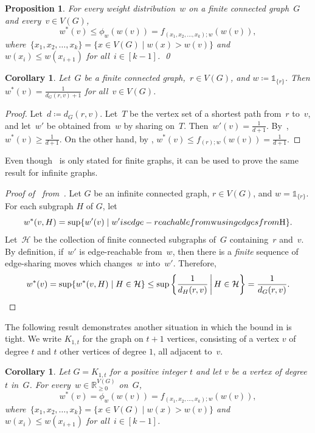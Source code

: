 \documentclass[reqno, 12pt]{amsart}
\numberwithin{equation}{section}
\numberwithin{figure}{section}
\theoremstyle{plain}
\newtheorem{cor}[thm]{Corollary}
\newtheorem{proposition}[thm]{Proposition}
\theoremstyle{definition}
\newcommand*{\weights}{\ensuremath{\mathbb{R}_{\geq 0}^{V(G)}}}
\begin{document}
\begin{proposition}
    \label{prop:main2} 
    For every weight distribution~$w$ on a finite connected graph~$G$ and every~${v \in V(G)}$, 
    \[
        {w^*(v) \leq \phi_{w}(w(v)) = f_{(x_1,x_2, \ldots, x_k); w}(w(v))},
    \]
    where~$\{x_1, x_2, \ldots, x_k\}=\{x \in V(G) \mid w(x) > w(v)\}$ and ${w(x_i) \leq w(x_{i+1})}$ for all~${i \in [k-1]}$. 
    \qed
\end{proposition}

\begin{cor}
    \label{cor-singlesourcesink}
    Let~$G$ be a finite connected graph,~${r \in V(G)}$, and ${w \coloneq \mathds{1}_{\{r\}}}$. 
    Then ${w^*(v) = \frac{1}{d_G(r, v)+1}}$ for all~${v \in V(G)}$.  
\end{cor}

\begin{proof}
    Let~${d \coloneqq d_G(r, v)}$. 
    Let~$T$ be the vertex set of a shortest path from~$r$ to~$v$, and let~$w'$ be obtained from~$w$ by sharing on~$T$. 
    Then~${w'(v) = \frac{1}{d+1}}$. 
    By~,~${w^*(v) \geq \frac{1}{d+1}}$. On the other hand, by ,  
    ${w^*(v) \leq f_{(r); w}(w(v)) = \frac{1}{d+1}}$. 
\end{proof}

Even though~ is only stated for finite graphs, it can be used to prove the same result for infinite graphs.  

\begin{proof}[Proof of~ from~]
    Let $G$ be an infinite connected graph, $r \in V(G)$, and $w=\mathds{1}_{\{r\}}$.  For each subgraph $H$ of $G$, let 
    \[
        w^*(v,H) = \sup \{ w'(v) \mid w' \textnormal{ is edge-reachable from $w$ using edges from $H$}\}. 
    \]
    Let~$\mathcal{H}$ be the collection of finite connected subgraphs of~$G$ containing~$r$ and~$v$. 
    By definition, if~$w'$ is edge-reachable from~$w$, then there is a \emph{finite} sequence of edge-sharing moves which changes~$w$ into~$w'$. 
    Therefore,
    \[
        w^*(v) = \sup \{w^*(v,H) \mid H \in \mathcal{H} \} \leq \sup \left\{ \frac{1}{d_H(r,v)} \,\middle|\, H \in \mathcal{H} \right\}=\frac{1}{d_G(r,v)}. \qedhere
    \]
\end{proof}

The following result demonstrates another situation in which the bound in  is tight. 
We write $K_{1,t}$ for the graph on $t+1$ vertices, consisting of a vertex $v$ of degree $t$ and $t$ other vertices of degree $1$, all adjacent to~$v$.
\begin{cor}
    \label{cor-finitestars}
    Let $G=K_{1,t}$ for a positive integer $t$ and let $v$ be a vertex of degree~$t$ in~$G$.
    For every~${w \in \weights}$ on~$G$, 
    \[
        {w^*(v) = \phi_{w}(w(v)) = f_{(x_1,x_2, \ldots, x_k); w}(w(v))},
    \]
    where~$\{x_1, x_2, \ldots, x_k\}=\{x \in V(G) \mid w(x) > w(v)\}$ and ${w(x_i) \leq w(x_{i+1})}$ for all~${i \in [k-1]}$.  
\end{cor}
\end{document}
